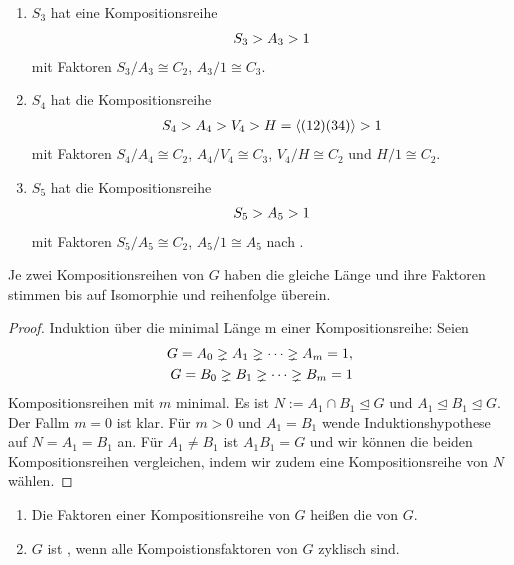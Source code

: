 \begin{example}
	\begin{enumerate}
		\item $S_3$ hat eine Kompositionsreihe
		\begin{align}
			S_3 > A_3 > 1 \notag
		\end{align}
		mit Faktoren $S_3 /A_3 \cong C_2$, $A_3/1 \cong C_3$.
		\item $S_4$ hat die Kompositionsreihe
		\begin{align}
			S_4 > A_4 > V_4 > H=\langle (12)(34)\rangle > 1 \notag
		\end{align}
		mit Faktoren $S_4/A_4 \cong C_2$, $A_4/V_4 \cong C_3$, $V_4/H \cong C_2 \text{ und } H/1\cong C_2$.
		\item $S_5$ hat die Kompositionsreihe
		\begin{align}
			S_5 > A_5 > 1\notag
		\end{align}
		mit Faktoren $S_5/A_5 \cong C_2$, $A_5/1 \cong A_5$ nach .
	\end{enumerate}
\end{example}

\begin{theorem}
	Je zwei Kompositionsreihen von $G$ haben die gleiche Länge und ihre Faktoren stimmen bis auf Isomorphie und reihenfolge überein.
\end{theorem}

\begin{proof}
	 Induktion über die minimal Länge m einer Kompositionsreihe: Seien
	 \begin{align}
	 	G = A_0 \gneq A_1 \gneq \dotsm \gneq A_m = 1,\notag \\
	 	G = B_0 \gneq B_1 \gneq \dotsm \gneq B_m = 1\notag
	 \end{align}
	 Kompositionsreihen mit $m$ minimal. Es ist $N := A_1 \cap B_1 \unlhd G$ und $A_1 \unlhd B_1 \unlhd G$. Der Fallm $m = 0$ ist klar. Für $m > 0$ und $A_1 = B_1$ wende Induktionshypothese auf $N = A_1 = B_1$ an.
	 Für $A_1 \neq B_1$ ist $A_1 B_1 = G$ und wir können die beiden Kompositionsreihen vergleichen, indem wir zudem eine Kompositionsreihe von $N$ wählen.
\end{proof}

\begin{definition}
	\begin{enumerate}
		\item Die Faktoren einer Kompositionsreihe von $G$ heißen die  von $G$.
		\item $G$ ist , wenn alle Kompoistionsfaktoren von $G$ zyklisch sind.
	\end{enumerate}
\end{definition}

